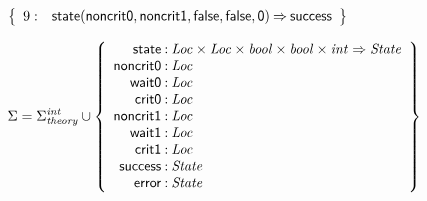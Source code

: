 \documentclass[a4paper]{article}
\def\lthtmlcheckvsize{\ifdim\ht\sizebox<\vsize 
  \ifdim\wd\sizebox<\hsize\expandafter\hfill\fi \expandafter\vfill
  \else\expandafter\vss\fi}%
\begin{document}
{\newpage\clearpage
{}%
$\displaystyle \left\{
\begin{array}{rr@{\>}c@{\>}ll}
\mathrm{9} : 
 & \mathsf{state}(\mathsf{noncrit0},\mathsf{noncrit1},\mathsf{false},\mathsf{false},\mathsf{0})
 & \Rightarrow 
 & \mathsf{success}\\
\par
\end{array}
\right\}
$%
\lthtmlindisplaymathZ
\lthtmlcheckvsize\clearpage}

{\newpage\clearpage
{}%
$\displaystyle \Sigma = 
\Sigma^{\mathit{int}}_{\mathit{theory}}\cup\left\{
\begin{array}{r@{\>}c@{\>}l}
\mathsf{state} & : & \mathit{Loc} \times \mathit{Loc} \times \mathit{bool} \times \mathit{bool} \times \mathit{int} \Rightarrow \mathit{State}\\
\mathsf{noncrit0} & : & \mathit{Loc}\\
\mathsf{wait0} & : & \mathit{Loc}\\
\mathsf{crit0} & : & \mathit{Loc}\\
\mathsf{noncrit1} & : & \mathit{Loc}\\
\mathsf{wait1} & : & \mathit{Loc}\\
\mathsf{crit1} & : & \mathit{Loc}\\
\mathsf{success} & : & \mathit{State}\\
\mathsf{error} & : & \mathit{State}\\
\end{array}
\right\}
$%
\lthtmlindisplaymathZ
\lthtmlcheckvsize\clearpage}
\end{document}
